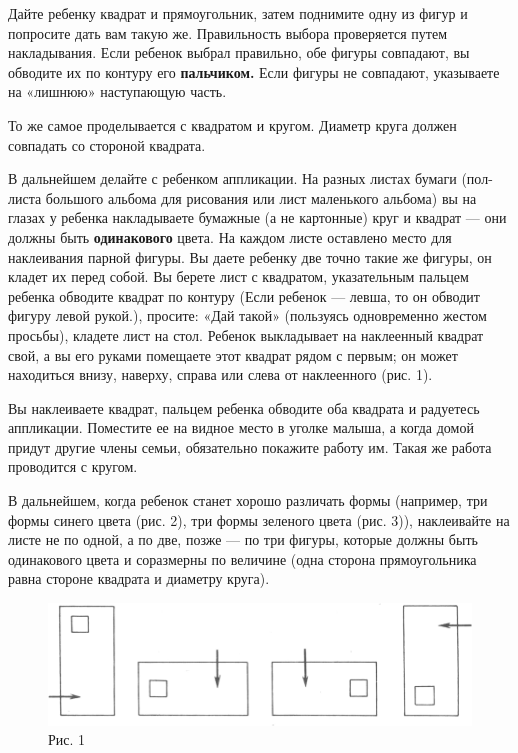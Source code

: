 \documentclass{book}
\begin{document}
Дайте ребенку квадрат и прямоугольник, затем поднимите одну из фигур и
попросите дать вам такую же. Правильность выбора проверяется путем
накладывания. Если ребенок выбрал правильно, обе фигуры совпадают, вы
обводите их по контуру его \textbf{пальчиком.} Если фигуры не совпадают,
указываете на «лишнюю» наступающую часть.

То же самое проделывается с квадратом и кругом. Диаметр круга должен
совпадать со стороной квадрата.

В дальнейшем делайте с ребенком аппликации. На разных листах бумаги
(пол-листа большого альбома для рисования или лист маленького альбома)
вы на глазах у ребенка накладываете бумажные (а не картонные) круг и
квадрат --- они должны быть \textbf{одинакового} цвета. На каждом листе
оставлено место для наклеивания парной фигуры. Вы даете ребенку две
точно такие же фигуры, он кладет их перед собой. Вы берете лист с
квадратом, указательным пальцем ребенка обводите квадрат по контуру
(Если ребенок --- левша, то он обводит фигуру левой рукой.), просите:
«Дай такой» (пользуясь одновременно жестом просьбы), кладете лист на
стол. Ребенок выкладывает на наклеенный квадрат свой, а вы его руками
помещаете этот квадрат рядом с первым; он может находиться внизу,
наверху, справа или слева от наклеенного (рис. 1).

Вы наклеиваете квадрат, пальцем ребенка обводите оба квадрата и
радуетесь аппликации. Поместите ее на видное место в уголке малыша, а
когда домой придут другие члены семьи, обязательно покажите работу им.
Такая же работа проводится с кругом.

В дальнейшем, когда ребенок станет хорошо различать формы (например, три
формы синего цвета (рис. 2), три формы зеленого цвета (рис. 3)),
наклеивайте на листе не по одной, а по две, позже --- по три фигуры,
которые должны быть одинакового цвета и соразмерны по величине (одна
сторона прямоугольника равна стороне квадрата и диаметру круга).

\begin{figure}
\centering
\includegraphics[width=\linewidth]{media/media/image1.jpg}
\caption*{Рис. 1}
\end{figure}
\end{document}
